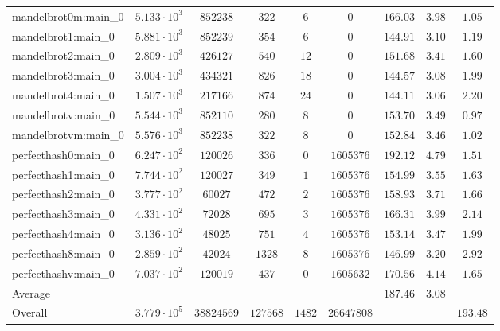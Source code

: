 \begin{tabular}{|l|c|c|c|c|c|c|c|c|}
mandelbrot0m:main\_0           & $ 5.133 \cdot 10^{3} $ & $ 852238   $ & $ 322    $ & $ 6    $ & $ 0        $ & $ 166.03      $ & $ 3.98    $ & $ 1.05    $ \\
mandelbrot1:main\_0            & $ 5.881 \cdot 10^{3} $ & $ 852239   $ & $ 354    $ & $ 6    $ & $ 0        $ & $ 144.91      $ & $ 3.10    $ & $ 1.19    $ \\
mandelbrot2:main\_0            & $ 2.809 \cdot 10^{3} $ & $ 426127   $ & $ 540    $ & $ 12   $ & $ 0        $ & $ 151.68      $ & $ 3.41    $ & $ 1.60    $ \\
mandelbrot3:main\_0            & $ 3.004 \cdot 10^{3} $ & $ 434321   $ & $ 826    $ & $ 18   $ & $ 0        $ & $ 144.57      $ & $ 3.08    $ & $ 1.99    $ \\
mandelbrot4:main\_0            & $ 1.507 \cdot 10^{3} $ & $ 217166   $ & $ 874    $ & $ 24   $ & $ 0        $ & $ 144.11      $ & $ 3.06    $ & $ 2.20    $ \\
mandelbrotv:main\_0            & $ 5.544 \cdot 10^{3} $ & $ 852110   $ & $ 280    $ & $ 8    $ & $ 0        $ & $ 153.70      $ & $ 3.49    $ & $ 0.97    $ \\
mandelbrotvm:main\_0           & $ 5.576 \cdot 10^{3} $ & $ 852238   $ & $ 322    $ & $ 8    $ & $ 0        $ & $ 152.84      $ & $ 3.46    $ & $ 1.02    $ \\
perfecthash0:main\_0           & $ 6.247 \cdot 10^{2} $ & $ 120026   $ & $ 336    $ & $ 0    $ & $ 1605376  $ & $ 192.12      $ & $ 4.79    $ & $ 1.51    $ \\
perfecthash1:main\_0           & $ 7.744 \cdot 10^{2} $ & $ 120027   $ & $ 349    $ & $ 1    $ & $ 1605376  $ & $ 154.99      $ & $ 3.55    $ & $ 1.63    $ \\
perfecthash2:main\_0           & $ 3.777 \cdot 10^{2} $ & $ 60027    $ & $ 472    $ & $ 2    $ & $ 1605376  $ & $ 158.93      $ & $ 3.71    $ & $ 1.66    $ \\
perfecthash3:main\_0           & $ 4.331 \cdot 10^{2} $ & $ 72028    $ & $ 695    $ & $ 3    $ & $ 1605376  $ & $ 166.31      $ & $ 3.99    $ & $ 2.14    $ \\
perfecthash4:main\_0           & $ 3.136 \cdot 10^{2} $ & $ 48025    $ & $ 751    $ & $ 4    $ & $ 1605376  $ & $ 153.14      $ & $ 3.47    $ & $ 1.99    $ \\
perfecthash8:main\_0           & $ 2.859 \cdot 10^{2} $ & $ 42024    $ & $ 1328   $ & $ 8    $ & $ 1605376  $ & $ 146.99      $ & $ 3.20    $ & $ 2.92    $ \\
perfecthashv:main\_0           & $ 7.037 \cdot 10^{2} $ & $ 120019   $ & $ 437    $ & $ 0    $ & $ 1605632  $ & $ 170.56      $ & $ 4.14    $ & $ 1.65    $ \\
\hline
Average                        & $                    $ & $          $ & $        $ & $      $ & $          $ & $ 187.46      $ & $ 3.08    $ & $         $ \\
\hline
Overall                        & $ 3.779 \cdot 10^{5} $ & $ 38824569 $ & $ 127568 $ & $ 1482 $ & $ 26647808 $ & $             $ & $         $ & $ 193.48  $ \\
\hline
\end{tabular}
